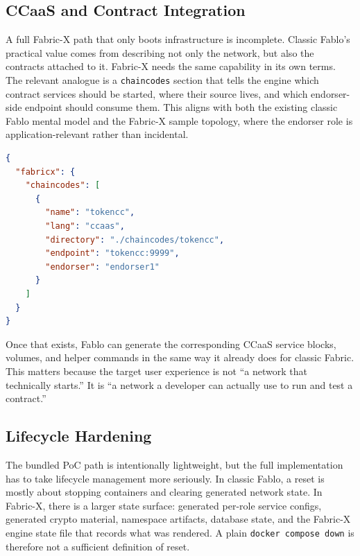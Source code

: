 \subsection{CCaaS and Contract Integration}

A full Fabric-X path that only boots infrastructure is incomplete. Classic Fablo's practical value comes from describing not only the network, but also the contracts attached to it. Fabric-X needs the same capability in its own terms. The relevant analogue is a \texttt{chaincodes} section that tells the engine which contract services should be started, where their source lives, and which endorser-side endpoint should consume them. This aligns with both the existing classic Fablo mental model and the Fabric-X sample topology, where the endorser role is application-relevant rather than incidental.

\begin{tcolorbox}[colback=gray!5!white, colframe=gray!50!black,
  title=Planned Fabric-X contract config,
  fonttitle=\bfseries, arc=4pt]
\begin{lstlisting}[language=json, basicstyle=\ttfamily\footnotesize]
{
  "fabricx": {
    "chaincodes": [
      {
        "name": "tokencc",
        "lang": "ccaas",
        "directory": "./chaincodes/tokencc",
        "endpoint": "tokencc:9999",
        "endorser": "endorser1"
      }
    ]
  }
}
\end{lstlisting}
\end{tcolorbox}

Once that exists, Fablo can generate the corresponding CCaaS service blocks, volumes, and helper commands in the same way it already does for classic Fabric. This matters because the target user experience is not ``a network that technically starts.'' It is ``a network a developer can actually use to run and test a contract.''

\subsection{Lifecycle Hardening}

The bundled PoC path is intentionally lightweight, but the full implementation has to take lifecycle management more seriously. In classic Fablo, a reset is mostly about stopping containers and clearing generated network state. In Fabric-X, there is a larger state surface: generated per-role service configs, generated crypto material, namespace artifacts, database state, and the Fabric-X engine state file that records what was rendered. A plain \texttt{docker compose down} is therefore not a sufficient definition of reset.


